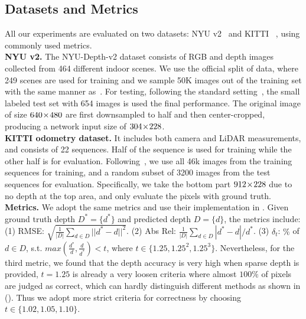 \subsection{Datasets and Metrics}
\label{subsec:data_metric}
All our experiments are evaluated on two datasets: NYU v2~\cite{silberman2012indoor} and KITTI ~\cite{geiger2012we}, using commonly used metrics.\\
\noindent\textbf{NYU v2.} The NYU-Depth-v2 dataset consists of RGB and depth images collected from 464 different indoor scenes. We use the official split of data, where 249 scenes are used for training and we sample 50K images out of the training set with the same manner as~\cite{Ma2017SparseToDense}. For testing, following the standard setting~\cite{eigen2015predicting,peng2016depth}, the small labeled test set with 654 images is used the final performance. The original image of size $640 \! \times \! 480$ are first downsampled to half and then center-cropped, producing a network input size of $304 \! \times \! 228$.\\
\noindent\textbf{KITTI odometry dataset.} It includes both camera and LiDAR measurements, and consists of 22 sequences. Half of the sequence is
used for training while the other half is for evaluation. Following~\cite{Ma2017SparseToDense}, we use all 46k images from the training sequences for training, and a random subset of 3200 images from the test sequences for evaluation. Specifically, we take the bottom part $912 \! \times \! 228$ due to no depth at the top area, and only evaluate the pixels with ground truth.\\
\noindent\textbf{Metrics.} We adopt the same metrics and use their implementation in \cite{Ma2017SparseToDense}. Given ground truth depth $D^* = \{d^*\}$ and predicted depth $D = \{d\}$, the metrics include:  (1) RMSE: $\sqrt{\frac{1}{|D|}\sum_{d \in D}||d^* - d||^2}$. (2) Abs Rel: $\frac{1}{|D|}\sum_{d \in D}|d^* - d|/d^*$. (3) $\delta_t$: $\%$ of $d \in D$, s.t. $max(\frac{d^*}{d}, \frac{d}{d^*})<t$, where $t \in \{1.25, 1.25^2, 1.25^3\}$. Nevertheless, for the third metric, we found that the depth accuracy is very high when sparse depth is provided, $t = 1.25$ is already a very loosen criteria where  almost $100\%$ of pixels are judged as correct, which can hardly distinguish different methods as shown in (). Thus we adopt more strict criteria for correctness by choosing $t \in \{1.02, 1.05, 1.10\}$.


